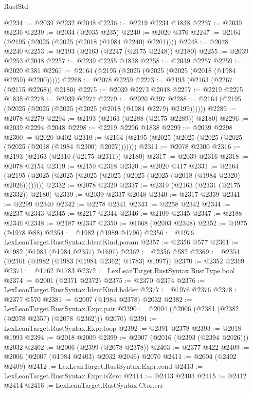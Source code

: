 \begin{lexlean}{RustStd}
\begin{coremodule}
@2234 := @2039 @2232 @2048
@2236 := @2219 @2234 @1838
@2237 := @2039 @2236
@2239 := @2034 (@2035 @235)
@2240 := @2020 @376
@2247 := @2164 (@2195 (@2025 (@2025 (@2018 (@1984 @2240) @2201))))
@2248 := @2078 @2240
@2253 := @2193 (@2163 (@2247 (@2175 @2248)) @2180)
@2255 := @2039 @2253 @2048
@2257 := @2239 @2255 @1838
@2258 := @2039 @2257
@2259 := @2020 @381
@2267 := @2164 (@2195 (@2025 (@2025 (@2025 (@2018 (@1984 @2259) @2200)))))
@2268 := @2078 @2259
@2273 := @2193 (@2163 (@2267 (@2175 @2268)) @2180)
@2275 := @2039 @2273 @2048
@2277 := @2219 @2275 @1838
@2278 := @2039 @2277
@2279 := @2020 @397
@2288 := @2164 (@2195 (@2025 (@2025 (@2025 (@2025 (@2018 (@1984 @2279) @2199))))))
@2289 := @2078 @2279
@2294 := @2193 (@2163 (@2288 (@2175 @2289)) @2180)
@2296 := @2039 @2294 @2048
@2298 := @2219 @2296 @1838
@2299 := @2039 @2298
@2300 := @2020 @402
@2310 := @2164 (@2195 (@2025 (@2025 (@2025 (@2025 (@2025 (@2018 (@1984 @2300) @2027)))))))
@2311 := @2078 @2300
@2316 := @2193 (@2163 (@2310 (@2175 @2311)) @2180)
@2317 := @2039 @2316
@2318 := @2078 @2154
@2319 := @2159 @2318
@2320 := @2020 @417
@2331 := @2164 (@2195 (@2025 (@2025 (@2025 (@2025 (@2025 (@2025 (@2018 (@1984 @2320) @2026))))))))
@2332 := @2078 @2320
@2337 := @2319 (@2163 (@2331 (@2175 @2332)) @2180)
@2339 := @2039 @2337 @2048
@2340 := @2317 @2339
@2341 := @2299 @2340
@2342 := @2278 @2341
@2343 := @2258 @2342
@2344 := @2237 @2343
@2345 := @2217 @2344
@2346 := @2109 @2345
@2347 := @2188 @2346
@2348 := @2187 @2347
@2350 := @1668 (@2003 @2348)
@2352 := @1975 (@1978 @88)
@2354 := @1982 (@1989 @1796)
@2356 := @1976 LexLeanTarget.RustSyntax.IdentKind.param
@2357 := @2356 @577
@2361 := @1982 (@1983 (@1984 @2357) @1691)
@2362 := @2356 @582
@2369 := @2354 (@2361 (@1982 (@1983 (@1984 @2362) @1783) @1997))
@2370 := @2352 @2369
@2371 := @1762 @1783
@2372 := LexLeanTarget.RustSyntax.RustType.bool
@2374 := @2001 (@2371 @2372)
@2375 := @2370 @2374
@2376 := LexLeanTarget.RustSyntax.IdentKind.holder
@2377 := @1976 @2376
@2378 := @2377 @570
@2381 := @2007 (@1984 @2378) @2032
@2382 := LexLeanTarget.RustSyntax.Expr.pair
@2390 := @2004 (@2006 (@2381 (@2382 (@2078 @2357) (@2078 @2362))) @2070)
@2391 := LexLeanTarget.RustSyntax.Expr.loop
@2392 := @2391 @2378
@2393 := @2018 @1993
@2394 := @2018 @2009
@2399 := @2007 (@2016 (@2393 (@2394 @2026))) @2032
@2402 := @2006 (@2399 (@2078 @2378))
@2403 := @2377 @422
@2409 := @2006 (@2007 (@1984 @2403) @2032 @2046) @2070
@2411 := @2004 (@2402 @2409)
@2412 := LexLeanTarget.RustSyntax.Expr.cond
@2413 := LexLeanTarget.RustSyntax.Expr.isZero
@2414 := @2413 @2403
@2415 := @2412 @2414
@2416 := LexLeanTarget.RustSyntax.Ctor.err

\end{coremodule}
\end{lexlean}
